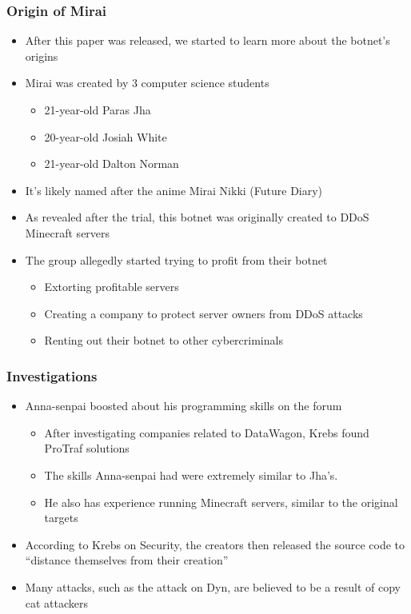 \documentclass{beamer}
\begin{document}
\begin{frame}
	\frametitle{Origin of Mirai}
	\begin{itemize}
		\item<+-> After this paper was released, we started to learn more about the botnet's origins
		\item<+-> Mirai was created by 3 computer science students
		\begin{itemize}
			\item<+-> 21-year-old Paras Jha
			\item<+-> 20-year-old Josiah White
			\item<+-> 21-year-old Dalton Norman
		\end{itemize}
		\item<+-> It's likely named after the anime Mirai Nikki (Future Diary)
		\item<+-> As revealed after the trial, this botnet was originally created to DDoS Minecraft servers
		\item<+-> The group allegedly started trying to profit from their botnet
		\begin{itemize}
			\item<+-> Extorting profitable servers
			\item<+-> Creating a company to protect server owners from DDoS attacks
			\item<+-> Renting out their botnet to other cybercriminals
		\end{itemize}
	\end{itemize}
\end{frame}

\begin{frame}
	\frametitle{Investigations}
	\begin{itemize}
		\item<+-> Anna-senpai boosted about his programming skills on the forum
		\begin{itemize}
			\item<+-> After investigating companies related to DataWagon, Krebs found ProTraf solutions
			\item<+-> The skills Anna-senpai had were extremely similar to Jha's.
			\item<+-> He also has experience running Minecraft servers, similar to the original targets
		\end{itemize}
		\item<+-> According to Krebs on Security, the creators then released the source code to ``distance themselves from their creation''
		\item<+-> Many attacks, such as the attack on Dyn, are believed to be a result of copy cat attackers
	\end{itemize}
\end{frame}
\end{document}
